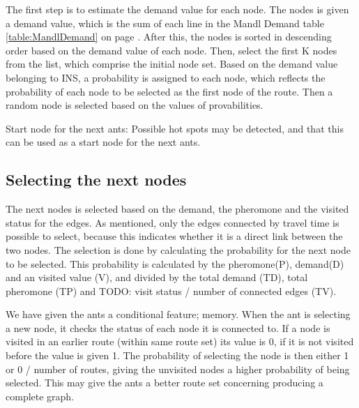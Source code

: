 The first step is to estimate the demand value for each node. The nodes is given a demand value, which is the sum of each line in the Mandl Demand table \ref{table:MandlDemand} on page \pageref{table:MandlDemand}.
After this, the nodes is sorted in descending order based on the demand value of each node.
Then, select the first K nodes from the list, which comprise the initial node set. Based on the demand value belonging to INS, a probability is assigned to each node, which reflects the probability of each node to be selected as the first node of the route. Then a random node is selected based on the values of provabilities. 

Start node for the next ants: Possible hot spots may be detected, and that this can be used as a start node for the next ants. 

\subsection{Selecting the next nodes}




\begin{algorithm}[H]
\end{algorithm}

The next nodes is selected based on the demand, the pheromone and the visited status for the edges. As mentioned, only the edges connected by travel time is possible to select, because this indicates whether it is a direct link between the two nodes. The selection is done by calculating the probability for the next node to be selected. This probability is calculated by the pheromone(P), demand(D) and an visited value (V), and divided by the total demand (TD), total pheromone (TP) and TODO: visit status / number of connected edges (TV).

We have given the ants a conditional feature; memory. When the ant is selecting a new node, it checks the status of each node it is connected to. If a node is visited in an earlier route (within same route set) its value is 0, if it is not visited before the value is given 1. The probability of selecting the node is then either 1 or 0 / number of routes, giving the unvisited nodes a higher probability of being selected. This may give the ants a better route set concerning producing a complete graph.


